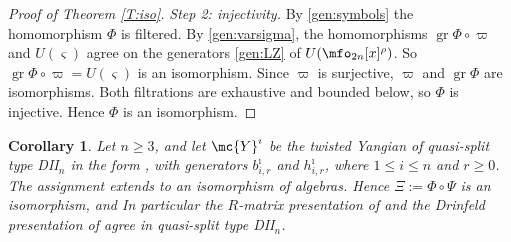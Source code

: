 \documentclass{amsart}
\newtheorem{crl}[theorem]{Corollary}
\numberwithin{equation}{section}
\theoremstyle{remark}
\DeclareMathOperator{\gr}{gr}
\renewcommand{\,}{\kern 0.1em} %
\begin{document}
\begin{proof}[Proof of Theorem \ref{T:iso}]
\smallskip

{\it Step 2: injectivity.} By \eqref{gen:symbols} the homomorphism $\Phi$ is filtered. By
\eqref{gen:varsigma}, the homomorphisms $\gr\Phi\circ\varpi$ and $U(\varsigma)$ agree on the
generators \eqref{gen:LZ} of $U(\mfo_{2n}[x]^\rho)$. So $\gr\Phi\circ\varpi=U(\varsigma)$ is an
isomorphism. Since $\varpi$ is surjective, $\varpi$ and $\gr\Phi$ are isomorphisms. Both
filtrations are exhaustive and bounded below, so $\Phi$ is injective. Hence $\Phi$ is an
isomorphism.
%
\end{proof}

\begin{crl} \label{C:LWZ}
%
Let $n\ge3$, and let $\mc{Y}^\imath$ be the twisted Yangian of quasi-split type {\rm DII}$_n$ in
the form \cite[Def.~2.10]{HL26}, with generators $b^\imath_{i,r}$ and $h^\imath_{i,r}$, where
$1\le i\le n$ and $r\ge0$. The assignment
%
%
extends to an isomorphism of algebras. Hence $\Xi := \Phi\circ\Psi$ is an isomorphism, and
%
%
In particular the $R$-matrix presentation of \cite{GR16} and the Drinfeld presentation of
\cite{LZ25} agree in quasi-split type DII$_n$.
%
\end{crl}
\end{document}

